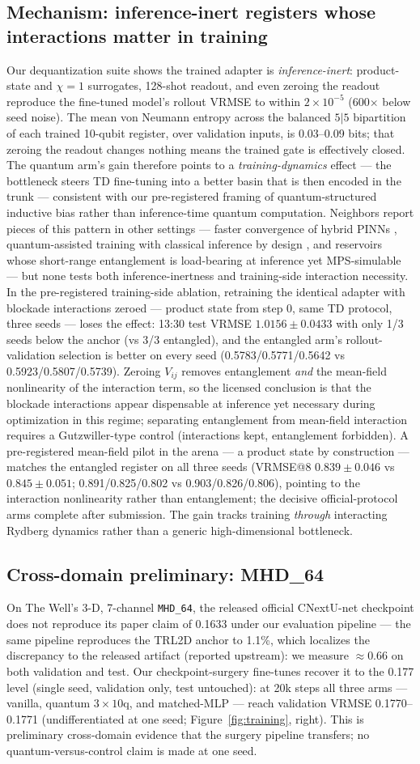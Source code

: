 \documentclass{article}
\makeatletter
\newcommand{\MHDmlp}{0.1770--0.1771}          %
\newcommand{\AblationVerdict}{In the pre-registered training-side ablation,
retraining the identical adapter with blockade interactions zeroed ---
product state from step 0, same TD protocol, three seeds --- loses the
effect: 13:30 test VRMSE $1.0156 \pm 0.0433$ with only 1/3 seeds below the
anchor (vs 3/3 entangled), and the entangled arm's rollout-validation
selection is better on every seed (0.5783/0.5771/0.5642 vs
0.5923/0.5807/0.5739). Zeroing $V_{ij}$ removes entanglement \emph{and}
the mean-field nonlinearity of the interaction term, so the licensed
conclusion is that the blockade interactions appear dispensable at
inference yet necessary during optimization in this regime; separating entanglement from mean-field interaction requires a
Gutzwiller-type control (interactions kept, entanglement forbidden). A
pre-registered mean-field pilot in the arena --- a product state by
construction --- matches the entangled register on all three seeds
(VRMSE@8 $0.839 \pm 0.046$ vs $0.845 \pm 0.051$; 0.891/0.825/0.802 vs
0.903/0.826/0.806), pointing to the interaction nonlinearity rather than
entanglement; the decisive official-protocol arms complete after
submission. The gain tracks training \emph{through} interacting
Rydberg dynamics rather than a generic high-dimensional bottleneck.}
\makeatother
\begin{document}
\subsection{Mechanism: inference-inert registers whose interactions matter in training}
\label{sec:mechanism}

Our dequantization suite shows the trained adapter is
\emph{inference-inert}: product-state and $\chi{=}1$ surrogates, 128-shot
readout, and even zeroing the readout reproduce the fine-tuned model's
rollout VRMSE to within $2{\times}10^{-5}$ (600$\times$ below seed noise).
The mean von Neumann entropy across the balanced $5|5$ bipartition of each
trained 10-qubit register, over validation inputs, is 0.03--0.09 bits;
that zeroing the readout changes nothing means the trained gate is
effectively closed. The quantum arm's gain therefore points to a
\emph{training-dynamics} effect --- the bottleneck steers TD fine-tuning
into a better basin that is then encoded in the trunk --- consistent with
our pre-registered framing of quantum-structured inductive bias rather than
inference-time quantum computation. Neighbors report pieces of this
pattern in other settings --- faster convergence of hybrid PINNs
\citep{klement2026qpinn}, quantum-assisted training with classical
inference by design \citep{chen2026dropprior}, and reservoirs whose
short-range entanglement is load-bearing at inference yet MPS-simulable
\citep{delorenzis2025qelm} --- but none tests both inference-inertness and
training-side interaction necessity. \AblationVerdict

\subsection{Cross-domain preliminary: MHD\_64}
\label{sec:mhd}

On The Well's 3-D, 7-channel \texttt{MHD\_64}, the released official
CNextU-net checkpoint does not reproduce its paper claim of 0.1633 under
our evaluation pipeline --- the same pipeline reproduces the TRL2D anchor
to 1.1\%, which localizes the discrepancy to the released artifact
(reported upstream): we measure $\approx$0.66 on both validation and test.
Our checkpoint-surgery fine-tunes recover it to the 0.177 level (single
seed, validation only, test untouched): at 20k steps all three arms ---
vanilla, quantum $3{\times}10$q, and matched-MLP --- reach validation VRMSE
\MHDmlp{} (undifferentiated at one seed;
Figure~\ref{fig:training}, right). This is
preliminary cross-domain evidence that the surgery pipeline transfers; no
quantum-versus-control claim is made at one seed.
\end{document}
